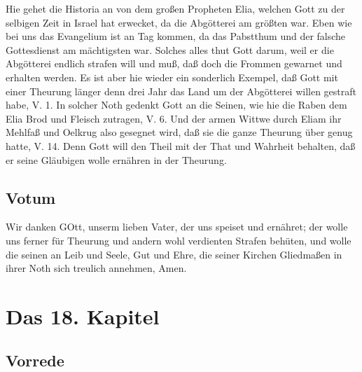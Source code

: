 Hie gehet die Historia an von dem großen Propheten Elia, welchen Gott zu der selbigen Zeit in Israel hat erwecket, da die Abgötterei am größten war. Eben wie bei uns das Evangelium ist an Tag kommen, da das Pabstthum und der falsche Gottesdienst am mächtigsten war. Solches alles thut Gott darum, weil er die Abgötterei endlich strafen will und muß, daß doch die Frommen gewarnet und erhalten werden. Es ist aber hie wieder ein sonderlich Exempel, daß Gott mit einer Theurung länger denn drei Jahr das Land um der Abgötterei willen gestraft habe, V. 1. In solcher Noth gedenkt Gott an die Seinen, wie hie die Raben dem Elia Brod und Fleisch zutragen, V. 6. Und der armen Wittwe durch Eliam ihr Mehlfaß und Oelkrug also gesegnet wird, daß sie die ganze Theurung über genug hatte, V. 14. Denn Gott will den Theil mit der That und Wahrheit behalten, daß er seine Gläubigen wolle ernähren in der Theurung.

\section{Votum}

Wir danken GOtt, unserm lieben Vater, der uns speiset und ernähret; der wolle uns ferner für Theurung und andern wohl verdienten Strafen behüten, und wolle die seinen an Leib und Seele, Gut und Ehre, die seiner Kirchen Gliedmaßen in ihrer Noth sich treulich annehmen, Amen.

\chapter{Das 18. Kapitel}

\section{Vorrede}

